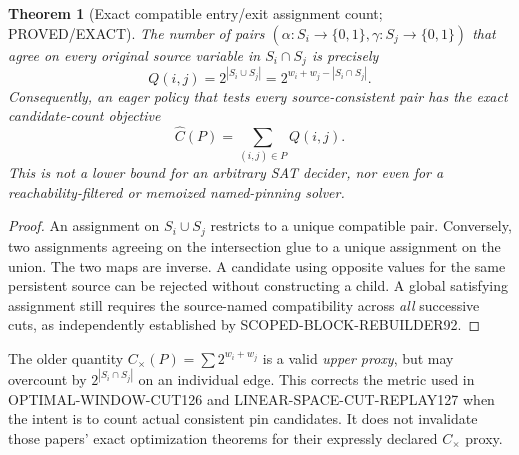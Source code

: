 \documentclass[11pt]{article}
\newtheorem{theorem}{Theorem}
\begin{document}
\begin{theorem}[Exact compatible entry/exit assignment count; PROVED/EXACT]
The number of pairs \((\alpha:S_i\to\{0,1\},\gamma:S_j\to\{0,1\})\) that agree on every original source variable in \(S_i\cap S_j\) is precisely
\[
 \boxed{Q(i,j)=2^{|S_i\cup S_j|}
 =2^{w_i+w_j-|S_i\cap S_j|}.}
\]
Consequently, an \emph{eager policy that tests every source-consistent pair} has the exact candidate-count objective
\[
 \boxed{\widehat C(P)=\sum_{(i,j)\in P}Q(i,j).}
\]
This is not a lower bound for an arbitrary SAT decider, nor even for a reachability-filtered or memoized named-pinning solver.
\end{theorem}
\begin{proof}
An assignment on \(S_i\cup S_j\) restricts to a unique compatible pair. Conversely, two assignments agreeing on the intersection glue to a unique assignment on the union. The two maps are inverse. A candidate using opposite values for the same persistent source can be rejected without constructing a child. A global satisfying assignment still requires the source-named compatibility across \emph{all} successive cuts, as independently established by SCOPED-BLOCK-REBUILDER92.
\end{proof}
The older quantity \(C_{\times}(P)=\sum2^{w_i+w_j}\) is a valid \emph{upper proxy}, but may overcount by \(2^{|S_i\cap S_j|}\) on an individual edge. This corrects the metric used in OPTIMAL-WINDOW-CUT126 and LINEAR-SPACE-CUT-REPLAY127 when the intent is to count actual consistent pin candidates. It does not invalidate those papers' exact optimization theorems for their expressly declared \(C_{\times}\) proxy.
\end{document}
